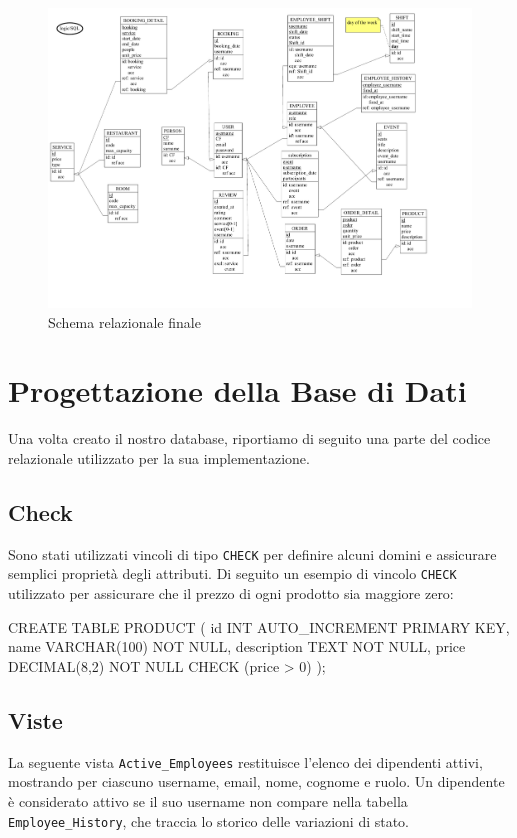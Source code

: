 \documentclass[a4paper,12pt]{report}
\begin{document}
\begin{figure}[H]
  \centering
  \includegraphics[width=\textwidth, trim=0 0 50pt 0]{./schemas/logic.pdf}
  \caption{Schema relazionale finale}
  \label{fig:schema-relazione}
\end{figure}
\newpage

\chapter{Progettazione della Base di Dati}
Una volta creato il nostro database, riportiamo di seguito una parte
del codice relazionale utilizzato per la sua implementazione.

\section{Check}
Sono stati utilizzati vincoli di tipo \texttt{CHECK} per definire
alcuni domini e assicurare
semplici proprietà degli attributi. Di seguito un esempio di vincolo
\texttt{CHECK} utilizzato
per assicurare che il prezzo di ogni prodotto sia maggiore zero:

\begin{sqlcode}[caption={},label={lst:check}]
CREATE TABLE PRODUCT (
    id INT AUTO_INCREMENT PRIMARY KEY,
    name VARCHAR(100) NOT NULL,
    description TEXT NOT NULL,
    price DECIMAL(8,2) NOT NULL CHECK (price > 0)
);
\end{sqlcode}

\section{Viste}
La seguente vista \texttt{Active\_Employees} restituisce l'elenco dei
dipendenti attivi, mostrando per ciascuno username, email, nome,
cognome e ruolo. Un dipendente è considerato attivo se il suo
username non compare nella tabella \texttt{Employee\_History}, che
traccia lo storico delle variazioni di stato.
\end{document}
